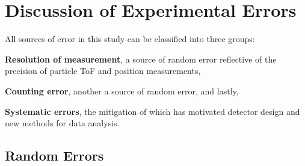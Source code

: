 \chapter{Discussion of Experimental Errors}
\label{Errors}
All sources of error in this study can be classified into three groups: \begin{enumerate*}[font={\color{red!50!black}\bfseries}]

\item \textbf{Resolution of measurement}, a source of random error reflective of the precision of particle ToF and position measurements,
\item \textbf{Counting error}, another a source of random error, and lastly,
\item \textbf{Systematic errors}, the mitigation of which has motivated detector design and new methods for data analysis.

\end{enumerate*}
\vspace{-4mm}
\section{Random Errors}

